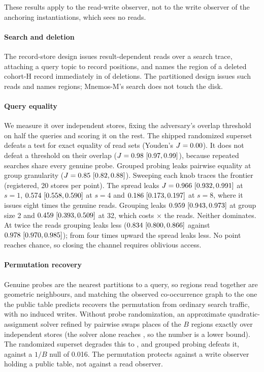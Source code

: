 These results apply to the read-write observer, not to the write observer of the anchoring
instantiations, which sees no reads.

\paragraph{Search and deletion}
The record-store design issues \RSearchReadsRS{} result-dependent reads over a search trace,
attaching a query topic to \RSearchPositionsRS{} record positions, and names the region of a deleted
cohort-H record immediately in \RDeleteNamedRS{} of \RDeleteN{} deletions. The partitioned design
issues \RSearchReadsP{} such reads and names \RDeleteNamedP{} regions; Mnemos-M's search does not
touch the disk.

\paragraph{Query equality}
We measure it over \REfifteenRepeats{} independent stores, fixing the adversary's overlap
threshold on half the queries and scoring it on the rest. The shipped randomized superset defeats a
test for exact equality of read sets (Youden's $J = 0.00$). It does not defeat a
threshold on their overlap ($J = 0.98~[0.97, 0.99]$), because repeated searches share every
genuine probe. Grouped probing leaks pairwise equality at group granularity
($J = 0.85~[0.82, 0.88]$). Sweeping each knob traces the frontier (registered, 20 stores per
point). The spread leaks $J = 0.966~[0.932, 0.991]$ at $s = 1$, $0.574~[0.558, 0.590]$ at $s = 4$
and $0.186~[0.173, 0.197]$ at $s = 8$, where it issues eight times the genuine reads. Grouping
leaks $0.959~[0.943, 0.973]$ at group size 2 and $0.459~[0.393, 0.509]$ at 32, which costs
\REtwentytwoGroupAmpThirtyTwo$\times$ the reads. Neither dominates. At twice the reads grouping
leaks less ($0.834~[0.800, 0.866]$ against $0.978~[0.970, 0.985]$); from four times upward the
spread leaks less. No point reaches chance, so closing the channel requires oblivious access.

\paragraph{Permutation recovery}
Genuine probes are the nearest partitions to a query, so regions read together are geometric
neighbours, and matching the observed co-occurrence graph to the one the public table predicts
recovers the permutation from ordinary search traffic, with no induced writes. Without probe
randomization, an approximate quadratic-assignment solver refined by pairwise swaps places
\REsevenExactCISone{} of the $B$ regions exactly over \REsevenRepeats{} independent stores (the
solver alone reaches \REsevenFaqSone, so the number is a lower bound). The randomized superset
degrades this to \REsevenExactStwo, and grouped probing defeats it, \REsevenExactGrouped{} against a
$1/B$ null of 0.016. The permutation protects against a write observer holding a public table, not
against a read observer.

